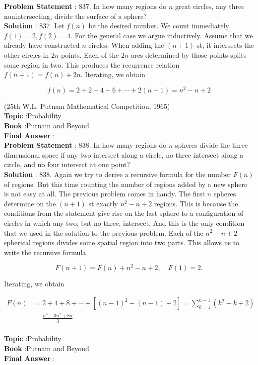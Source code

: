 \documentclass[10pt]{article}
\begin{document}
\textbf{Problem Statement} :
837. In how many regions do $n$ great circles, any three nonintersecting, divide the surface of a sphere?
\\
\textbf{Solution} :
837. Let $f(n)$ be the desired number. We count immediately $f(1)=2, f(2)=4$. For the general case we argue inductively. Assume that we already have constructed $n$ circles. When adding the $(n+1)$ st, it intersects the other circles in $2 n$ points. Each of the $2 n$ arcs determined by those points splits some region in two. This produces the recurrence relation $f(n+1)=f(n)+2 n$. Iterating, we obtain

$$
f(n)=2+2+4+6+\cdots+2(n-1)=n^{2}-n+2
$$

(25th W.L. Putnam Mathematical Competition, 1965)
\\
\textbf{Topic} :Probability\\
\textbf{Book} :Putnam and Beyond\\
\textbf{Final Answer} :\\


\textbf{Problem Statement} :
838. In how many regions do $n$ spheres divide the three-dimensional space if any two intersect along a circle, no three intersect along a circle, and no four intersect at one point?
\\
\textbf{Solution} :
838. Again we try to derive a recursive formula for the number $F(n)$ of regions. But this time counting the number of regions added by a new sphere is not easy at all. The previous problem comes in handy. The first $n$ spheres determine on the $(n+1)$ st exactly $n^{2}-n+2$ regions. This is because the conditions from the statement give rise on the last sphere to a configuration of circles in which any two, but no three, intersect. And this is the only condition that we used in the solution to the previous problem. Each of the $n^{2}-n+2$ spherical regions divides some spatial region into two parts. This allows us to write the recursive formula

$$
F(n+1)=F(n)+n^{2}-n+2, \quad F(1)=2 .
$$

Iterating, we obtain

$$
\begin{aligned}
F(n) &=2+4+8+\cdots+\left[(n-1)^{2}-(n-1)+2\right]=\sum_{k=1}^{n-1}\left(k^{2}-k+2\right) \\
&=\frac{n^{3}-3 n^{2}+8 n}{3}
\end{aligned}
$$
\\
\textbf{Topic} :Probability\\
\textbf{Book} :Putnam and Beyond\\
\textbf{Final Answer} :\\
\end{document}
